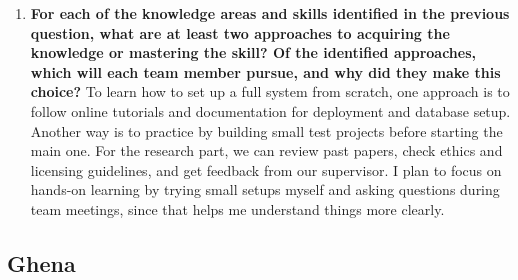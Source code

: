 \begin{enumerate}
  \item \textbf{For each of the knowledge areas and skills identified in the previous
  question, what are at least two approaches to acquiring the knowledge or
  mastering the skill?  Of the identified approaches, which will each team
  member pursue, and why did they make this choice?}
  To learn how to set up a full system from scratch, one approach is to follow online tutorials and documentation for deployment and database setup. Another way is to practice by building small test projects before starting the main one. For the research part, we can review past papers, check ethics and licensing guidelines, and get feedback from our supervisor. I plan to focus on hands-on learning by trying small setups myself and asking questions during team meetings, since that helps me understand things more clearly.
\end{enumerate}
\subsection*{Ghena}

